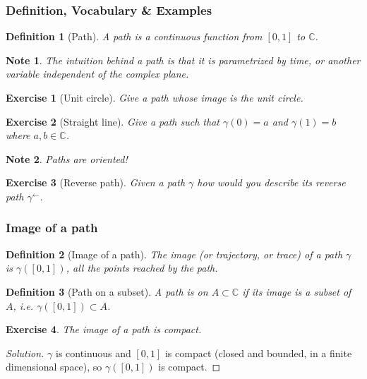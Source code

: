 \documentclass{article}
\newtheorem*{defi}{Definition}
\newtheorem*{note}{Note}
\newtheorem{exo}{Exercise}
\begin{document}
\subsubsection{Definition, Vocabulary \& Examples}
\begin{defi}[Path]
    A path is a continuous function from $[0, 1]$ to $\mathbb{C}$.
\end{defi}

\begin{note}
    The intuition behind a path is that it is parametrized by time, or another variable independent of the complex plane.
\end{note}

\begin{exo}[Unit circle]
    Give a path whose image is the unit circle.
\end{exo}

\begin{exo}[Straight line]
    Give a path such that $\gamma(0) = a$ and $\gamma(1) = b$ where $a, b \in \mathbb{C}$. 
\end{exo}

\begin{note}
    Paths are oriented!
\end{note}

\begin{exo}[Reverse path]
    Given a path $\gamma$ how would you describe its reverse path $\gamma^{\leftarrow}$.
\end{exo}


\subsubsection{Image of a path}
\begin{defi}[Image of a path]
    The image (or trajectory, or trace) of a path $\gamma$ is $\gamma([0,1])$, all the points reached by the path.
\end{defi}

\begin{defi}[Path on a subset]
    A path is \emph{on $A\subset\mathbb{C}$} if its image is a subset of $A$, i.e. $\gamma([0,1])\subset A$.
\end{defi}

\begin{exo}
    The image of a path is compact.
\end{exo}

\begin{proof}[Solution]
    $\gamma$ is continuous and $[0,1]$ is compact (closed and bounded, in a finite dimensional space), so $\gamma([0,1])$ is compact.
\end{proof}
\end{document}
